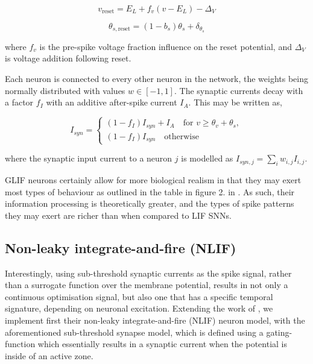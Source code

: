 \documentclass[mphil,deptreport,ianc]{infthesis} %
\begin{document}
\begin{equation}
    v_{\text{reset}} = E_L + f_v (v - E_L) - \Delta_V
\end{equation}

\begin{equation}
    \theta_{s,\text{reset}} = (1 - b_s) \theta_s + \delta_{\theta_s}
\end{equation}

where $f_v$ is the pre-spike voltage fraction influence on the reset potential, and $\Delta_V$ is voltage addition following reset.

Each neuron is connected to every other neuron in the network, the weights being normally distributed with values $w \in [-1, 1]$. The synaptic currents decay with a factor $f_I$ with an additive after-spike current $I_A$. This may be written as,

\begin{equation}
    I_{syn} = \begin{cases}
        (1 - f_I) I_{syn} + I_A \quad \text{for } v \geq \theta_v + \theta_s,\\
        (1 - f_I) I_{syn} \quad \text{otherwise}
    \end{cases}
\end{equation}

where the synaptic input current to a neuron $j$ is modelled as $I_{syn,j} = \sum_{i} w_{i,j} I_{i,j}$.

GLIF neurons certainly allow for more biological realism in that they may exert most types of behaviour as outlined in the table in figure 2. in \cite{Izhikevich2006}.
As such, their information processing is theoretically greater, and the types of spike patterns they may exert are richer than when compared to LIF SNNs.


\subsection{Non-leaky integrate-and-fire (NLIF)}

Interestingly, using sub-threshold synaptic currents as the spike signal, rather than a surrogate function over the membrane potential, results in not only a continuous optimisation signal, but also one that has a specific temporal signature, depending on neuronal excitation.
Extending the work of \cite{Huh2017}, we implement first their non-leaky integrate-and-fire (NLIF) neuron model, with the aforementioned sub-threshold synapse model, which is defined using a gating-function which essentially results in a synaptic current when the potential is inside of an active zone.
\end{document}
